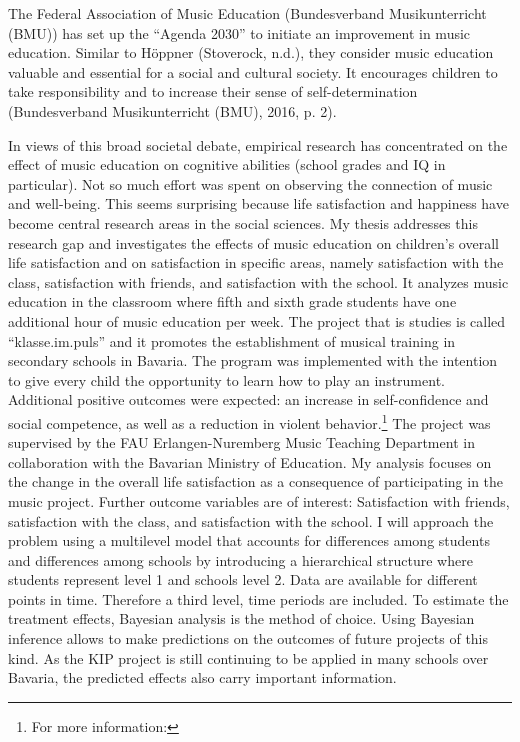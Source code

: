 \documentclass[a4, 12pt]{article}
\let\rmarkdownfootnote\footnote%
\def\footnote{\protect\rmarkdownfootnote}
\begin{document}
The Federal Association of Music Education (Bundesverband Musikunterricht (BMU)) has set up the ``Agenda 2030'' to initiate an improvement in music education. Similar to Höppner (Stoverock, n.d.), they consider music education valuable and essential for a social and cultural society. It encourages children to take responsibility and to increase their sense of self-determination (Bundesverband Musikunterricht (BMU), 2016, p. 2).

In views of this broad societal debate, empirical research has concentrated on the effect of music education on cognitive abilities (school grades and IQ in particular). Not so much effort was spent on observing the connection of music and well-being. This seems surprising because life satisfaction and happiness have become central research areas in the social sciences. My thesis addresses this research gap and investigates the effects of music education on children's overall life satisfaction and on satisfaction in specific areas, namely satisfaction with the class, satisfaction with friends, and satisfaction with the school. It analyzes music education in the classroom where fifth and sixth grade students have one additional hour of music education per week. The project that is studies is called ``klasse.im.puls'' and it promotes the establishment of musical training in secondary schools in Bavaria. The program was implemented with the intention to give every child the opportunity to learn how to play an instrument. Additional positive outcomes were expected: an increase in self-confidence and social competence, as well as a reduction in violent behavior.\footnote{For more information:} The project was supervised by the FAU Erlangen-Nuremberg Music Teaching Department in collaboration with the Bavarian Ministry of Education.
My analysis focuses on the change in the overall life satisfaction as a consequence of participating in the music project. Further outcome variables are of interest: Satisfaction with friends, satisfaction with the class, and satisfaction with the school. I will approach the problem using a multilevel model that accounts for differences among students and differences among schools by introducing a hierarchical structure where students represent level 1 and schools level 2. Data are available for different points in time. Therefore a third level, time periods are included. To estimate the treatment effects, Bayesian analysis is the method of choice. Using Bayesian inference allows to make predictions on the outcomes of future projects of this kind. As the KIP project is still continuing to be applied in many schools over Bavaria, the predicted effects also carry important information.
\end{document}
